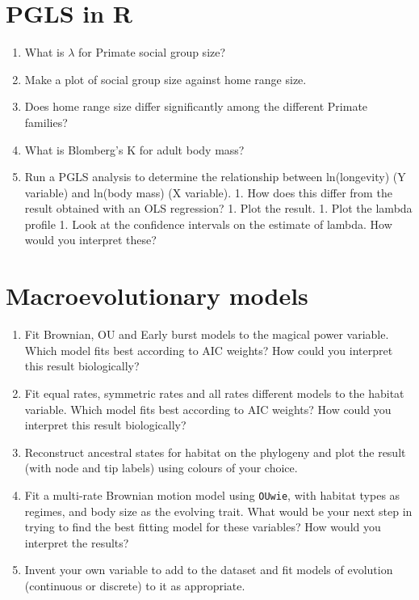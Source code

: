 \documentclass[]{book}
\providecommand{\tightlist}{%
  \setlength{\itemsep}{0pt}\setlength{\parskip}{0pt}}
\theoremstyle{definition}
\theoremstyle{definition}
\theoremstyle{definition}
\theoremstyle{remark}
\begin{document}
\section{PGLS in R}\label{pgls-in-r}

\begin{enumerate}
\def\labelenumi{\arabic{enumi}.}
\tightlist
\item
  What is \(\lambda\) for Primate social group size?
\item
  Make a plot of social group size against home range size.
\item
  Does home range size differ significantly among the different Primate
  families?
\item
  What is Blomberg's K for adult body mass?
\item
  Run a PGLS analysis to determine the relationship between
  ln(longevity) (Y variable) and ln(body mass) (X variable). 1. How does
  this differ from the result obtained with an OLS regression? 1. Plot
  the result. 1. Plot the lambda profile 1. Look at the confidence
  intervals on the estimate of lambda. How would you interpret these?
\end{enumerate}

\section{Macroevolutionary models}\label{macroevolutionary-models}

\begin{enumerate}
\def\labelenumi{\arabic{enumi}.}
\tightlist
\item
  Fit Brownian, OU and Early burst models to the magical power variable.
  Which model fits best according to AIC weights? How could you
  interpret this result biologically?
\item
  Fit equal rates, symmetric rates and all rates different models to the
  habitat variable. Which model fits best according to AIC weights? How
  could you interpret this result biologically?
\item
  Reconstruct ancestral states for habitat on the phylogeny and plot the
  result (with node and tip labels) using colours of your choice.
\item
  Fit a multi-rate Brownian motion model using \texttt{OUwie}, with
  habitat types as regimes, and body size as the evolving trait. What
  would be your next step in trying to find the best fitting model for
  these variables? How would you interpret the results?
\item
  Invent your own variable to add to the dataset and fit models of
  evolution (continuous or discrete) to it as appropriate.
\end{enumerate}
\end{document}
